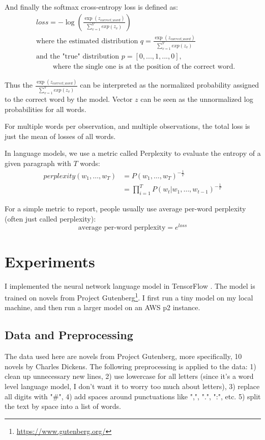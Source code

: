 \documentclass[a4paper]{article}
\begin{document}
And finally the softmax cross-entropy loss is defined as:
\begin{align}
  & loss = - \log \left( \frac{\exp(z_{correct\_word})}{\sum_{v=1}^V exp(z_v)} \right) \\
  & \text{where the estimated distribution } q = \frac{\exp(z_{correct\_word})}{\sum_{v=1}^V exp(z_v)} \\
  & \text{and the "true" distribution } p = [0, ..., 1, ..., 0], \\
  & \quad \quad \text{ where the single one is at the position of the correct word.}
\end{align}

Thus the $\frac{\exp(z_{correct\_word})}{\sum_{v=1}^V exp(z_v)}$ can be interpreted as the normalized probability assigned to the correct word by the model. Vector $z$ can be seen as the unnormalized log probabilities for all words. 

For multiple words per observation, and multiple observations, the total loss is just the mean of losses of all words. 

In language models, we use a metric called Perplexity to evaluate the entropy of a given paragraph with $T$ words:
\begin{align}
  perplexity(w_1, \dots, w_T) & = P(w_1, \dots, w_T)^{-\frac{1}{T}} \\
  & = \prod_{i=1}^T P(w_t|w_1, \dots, w_{t-1}) ^{-\frac{1}{T}}
\end{align}

For a simple metric to report, people usually use average per-word perplexity (often just called perplexity):
\begin{equation}
 \text{average per-word perplexity} = e^{loss}
\end{equation}

\section{Experiments}
I implemented the neural network language model in TensorFlow \citep{tensorflow2015-whitepaper}. The model is trained on novels from Project Gutenberg\footnote{\url{https://www.gutenberg.org/}}. I first run a tiny model on my local machine, and then run a larger model on an AWS p2 instance.

\subsection{Data and Preprocessing}
The data used here are novels from Project Gutenberg, more specifically, 10 novels by Charles Dickens. The following preprocessing is applied to the data: 1) clean up unnecessary new lines, 2) use lowercase for all letters (since it's a word level language model, I don't want it to worry too much about letters), 3) replace all digits with "\#", 4) add spaces around punctuations like ",", ".", ":", etc. 5) split the text by space into a list of words.
\end{document}
